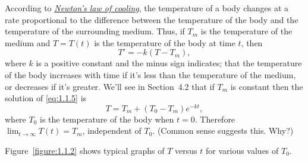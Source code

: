 \documentclass{ximera}
\begin{document}

\noindent
According to
\href{http://www-history.mcs.st-and.ac.uk/Mathematicians/Newton.html}
{\color{blue}\it Newton's
law of cooling},  the temperature of a
body changes at a rate proportional to the difference between the
temperature of the body and the temperature of the surrounding medium.
 Thus, if  $T_m$ is the temperature of the
medium and
$T=T(t)$ is the temperature of the body at time $t$, then
\begin{equation} \label{eq:1.1.5}
T' = -k(T-T_m),
\end{equation}
where $k$ is a positive constant and the  minus sign indicates;   that
the temperature of the body increases with time if it's less than the
temperature of the medium, or decreases if it's  greater. We'll see
in Section~4.2 that if
$T_m$ is constant then the solution of \eqref{eq:1.1.5} is
\begin{equation} \label{eq:1.1.6}
T=T_m+(T_0-T_m)e^{-kt},
\end{equation}
where $T_0$ is the temperature of the body when $t=0$.
Therefore $\lim_{t\to\infty}T(t)=T_m$, independent of $T_0$.
(Common sense suggests this. Why?)

Figure~\ref{figure:1.1.2} shows typical graphs of $T$ versus $t$ for
various values of  $T_0$.

\begin{image}
{\def\length{sqrt(1+(x+y)^2)}
}
\end{image}
\end{document}
